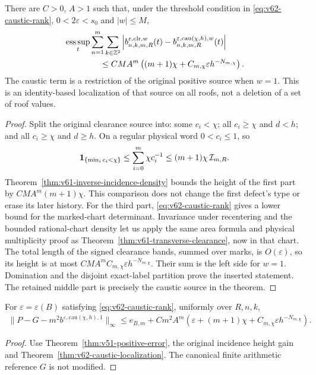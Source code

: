 \begin{theorem}
\label{thm:v62-caustic-localization}
There are $C>0$, $A>1$ such that, under the threshold condition in
\eqref{eq:v62-caustic-rank}, $0<2\varepsilon<s_0$ and $|w|\le M$,
\begin{align}\label{eq:v62-caustic-localization}
 &\operatorname*{ess\,sup}_t\sum_{n=1}^m\sum_{k\in\Z^2}
 \left|b^{\varepsilon,\mathrm{clr},w}_{n,k,m,R}(t)
       -b^{\varepsilon,\mathrm{cau}(\chi,h),w}_{n,k,m,R}(t)\right|
 \notag\\
 &\hspace{15mm}\le CMA^m\left((m+1)\chi+
                C_{m,\chi}\varepsilon h^{-N_{m,\chi}}\right).
\end{align}
The caustic term is a restriction of the original positive source when
$w=1$. This is an identity-based localization of that source on all
roofs, not a deletion of a set of roof values.
\end{theorem}
\begin{proof}
Split the original clearance source into: some $c_i<\chi$; all
$c_i\ge\chi$ and $d<h$; and all $c_i\ge\chi$ and $d\ge h$.
On a regular physical word $0<c_i\le1$, so
\[
 \mathbf1_{\{\min_i c_i<\chi\}}
       \le \sum_{i=0}^{m}\chi c_i^{-1}
       \le(m+1)\chi\,\mathcal I_{m,R}.
\]
Theorem~\ref{thm:v61-inverse-incidence-density} bounds the height
of the first part by $CMA^m(m+1)\chi$. This comparison does not
change the first defect's type or erase its later history.
For the third part, \eqref{eq:v62-caustic-rank} gives a lower
bound for the marked-chart determinant. Invariance under recentering
and the bounded rational-chart density let us apply the same area
formula and physical multiplicity proof as
Theorem~\ref{thm:v61-transverse-clearance}, now in that chart.
The total length of the signed clearance bands, summed over marks,
is $O(\varepsilon)$, so its height is at most
$CMA^m C_{m,\chi}\varepsilon h^{-N_{m,\chi}}$.
Their sum is the left side for $w=1$. Domination and the disjoint
exact-label partition prove the inserted statement. The retained middle
part is precisely the caustic source in the theorem.
\end{proof}

\begin{corollary}
\label{cor:v62-caustic-raw-error}
For $\varepsilon=\varepsilon(B)$ satisfying
\eqref{eq:v62-caustic-rank}, uniformly over $R,n,k$,
\begin{align}\label{eq:v62-caustic-raw-error}
 \|P-G-m^2b^{\varepsilon,\mathrm{cau}(\chi,h),1}\|_\infty
 \le e_{B,m}+Cm^2A^m\left(\varepsilon+(m+1)\chi+
             C_{m,\chi}\varepsilon h^{-N_{m,\chi}}\right).
\end{align}
\end{corollary}
\begin{proof}
Use Theorem~\ref{thm:v51-positive-error}, the original incidence
height gain and Theorem~\ref{thm:v62-caustic-localization}. The
canonical finite arithmetic reference $G$ is not modified.
\end{proof}


